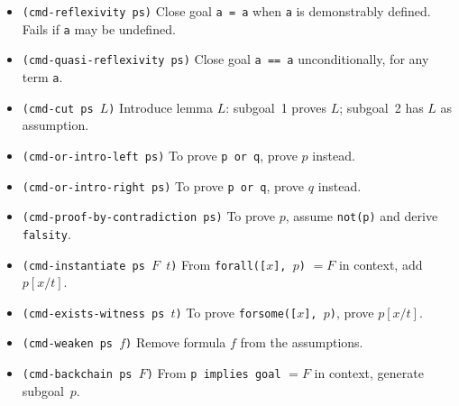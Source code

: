 \begin{itemize}
  \begin{VNBcode}
;;; Reordering of factors -- (rs) cannot close this, (crs) does:
(sp (make-wff-from-string
  "forall([x in ZZ, y in ZZ], x*y*x = x*x*y)"))
(crs)   ; closes in one step

;;; Commutative expansion:
(sp (make-wff-from-string
  "forall([x in ZZ, y in ZZ], (x+y)*(x+y) = x*x + 2*x*y + y*y)"))
(crs)
  \end{VNBcode}

  The procedure is a trusted oracle (it compares canonical normal forms
  rather than mechanising the ring properties), carrying the warrant
  \texttt{comm-ring-simplify} of kind \texttt{well-known}.  The primitive
  inference is \texttt{pi-comm-ring-simplify!} in
  \texttt{comm-ring-simplify.scm}.  The interactive short form is
  \texttt{(crs)}.

\item \texttt{(cmd-reflexivity ps)}
  Close goal \texttt{a = a} when \texttt{a} is demonstrably defined.
  Fails if \texttt{a} may be undefined.

\item \texttt{(cmd-quasi-reflexivity ps)}
  Close goal \texttt{a == a} unconditionally, for any term \texttt{a}.

\item \texttt{(cmd-cut ps $L$)}
  Introduce lemma $L$: subgoal~1 proves $L$; subgoal~2 has $L$ as assumption.

\item \texttt{(cmd-or-intro-left ps)}
  To prove \texttt{p or q}, prove $p$ instead.

\item \texttt{(cmd-or-intro-right ps)}
  To prove \texttt{p or q}, prove $q$ instead.

\item \texttt{(cmd-proof-by-contradiction ps)}
  To prove $p$, assume \texttt{not(p)} and derive \texttt{falsity}.

\item \texttt{(cmd-instantiate ps $F$\ $t$)}
  From \texttt{forall([$x$], $p$)} $= F$ in context, add $p[x/t]$.

\item \texttt{(cmd-exists-witness ps $t$)}
  To prove \texttt{forsome([$x$], $p$)}, prove $p[x/t]$.

\item \texttt{(cmd-weaken ps $f$)}
  Remove formula $f$ from the assumptions.

\item \texttt{(cmd-backchain ps $F$)}
  From \texttt{p implies goal} $= F$ in context, generate subgoal~$p$.


\end{itemize}
